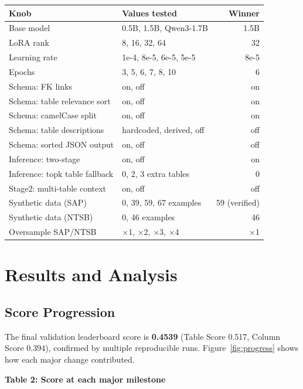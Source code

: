 \documentclass[10pt,twocolumn]{article}
\begin{document}
\begin{center}
\scriptsize
\setlength{\tabcolsep}{3pt}
\begin{tabular}{@{}llr@{}}
\toprule
Knob & Values tested & Winner \\
\midrule
Base model & 0.5B, 1.5B, Qwen3-1.7B & 1.5B \\
LoRA rank & 8, 16, 32, 64 & 32 \\
Learning rate & 1e-4, 8e-5, 6e-5, 5e-5 & 8e-5 \\
Epochs & 3, 5, 6, 7, 8, 10 & 6 \\
Schema: FK links & on, off & on \\
Schema: table relevance sort & on, off & on \\
Schema: camelCase split & on, off & on \\
Schema: table descriptions & hardcoded, derived, off & off \\
Schema: sorted JSON output & on, off & off \\
Inference: two-stage & on, off & on \\
Inference: topk table fallback & 0, 2, 3 extra tables & 0 \\
Stage2: multi-table context & on, off & off \\
Synthetic data (SAP) & 0, 39, 59, 67 examples & 59 (verified) \\
Synthetic data (NTSB) & 0, 46 examples & 46 \\
Oversample SAP/NTSB & $\times$1, $\times$2, $\times$3, $\times$4 & $\times$1 \\
\bottomrule
\end{tabular}
\end{center}

\section{Results and Analysis}
\label{sec:results}

\subsection*{Score Progression}

The final validation leaderboard score is \textbf{0.4539} (Table Score 0.517, Column Score 0.394), confirmed by multiple reproducible runs. Figure~\ref{fig:progress} shows how each major change contributed.

\vspace{4pt}
\noindent\textbf{Table 2: Score at each major milestone}
\vspace{2pt}
\end{document}
